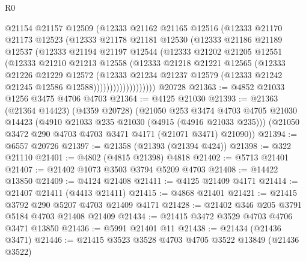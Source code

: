 \begin{lexlean}{R0}
\begin{coremodule}
                    @21154
                    @21157
                    @12509
                    (@12333
                      @21162
                      @21165
                      @12516
                      (@12333
                        @21170
                        @21173
                        @12523
                        (@12333
                          @21178
                          @21181
                          @12530
                          (@12333
                            @21186
                            @21189
                            @12537
                            (@12333
                              @21194
                              @21197
                              @12544
                              (@12333
                                @21202
                                @21205
                                @12551
                                (@12333
                                  @21210
                                  @21213
                                  @12558
                                  (@12333
                                    @21218
                                    @21221
                                    @12565
                                    (@12333
                                      @21226
                                      @21229
                                      @12572
                                      (@12333
                                        @21234
                                        @21237
                                        @12579
                                        (@12333 @21242 @21245 @12586 @12588)))))))))))))))))))
    @20728
@21363 := @4852 @21033 @1256 @3475 @4706 @4703
@21364 := @4125 @21030
@21393 := @21363
    (@21364 @14423)
    (@4359 @20728)
    (@21050
      @253
      @3474
      @4703
      @4705
      @21030
      @14423
      (@4910 @21033 @235 @21030 (@4915 (@4916 @21033 @235)))
      (@21050 @3472 @290 @4703 @4703 @3471 @4171 (@21071 @3471) @21090))
@21394 := @6557 @20726
@21397 := @21358 (@21393 (@21394 @424))
@21398 := @322 @21110
@21401 := @4802 (@4815 @21398) @4818
@21402 := @5713 @21401
@21407 := @21402 @1073 @3503 @3794 @5209 @4703
@21408 := @14422 @13850
@21409 := @4124 @21408
@21411 := @4125 @21409 @4171
@21414 := @21407 @21411 (@4413 @21411)
@21415 := @4868 @21401
@21421 := @21415 @3792 @290 @5207 @4703 @21409 @4171
@21428 := @21402 @346 @205 @3791 @5184 @4703 @21408 @21409
@21434 := @21415 @3472 @3529 @4703 @4706 @3471 @13850
@21436 := @5991 @21401 @11
@21438 := @21434 (@21436 @3471)
@21446 := @21415 @3523 @3528 @4703 @4705 @3522 @13849 (@21436 @3522)

\end{coremodule}
\end{lexlean}

